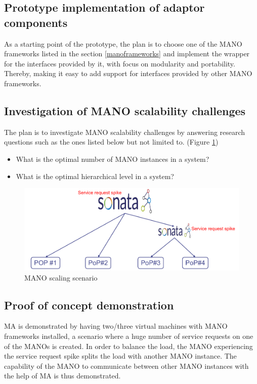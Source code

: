 \subsection{Prototype implementation of adaptor components}

As a starting point of the prototype, the plan is to choose one of the MANO frameworks listed in the section \ref{manoframeworks} and implement the wrapper for the interfaces provided by it, with focus on modularity and portability. Thereby, making it easy to add support for interfaces provided by other MANO frameworks.

\subsection{Investigation of MANO scalability challenges}
\label{wp3manoresearch}
The plan is to investigate MANO scalability challenges by answering research questions such as the ones listed below but not limited to. (Figure \ref{fig:wp3manoscale})
\begin{itemize}
	\item What is the optimal number of MANO instances in a system?
	\item What is the optimal hierarchical level in a system?
\end{itemize}

\begin{figure}[h]
	\centering
	\includegraphics[width=0.9\linewidth]{figures/wp3manoScale}
	\caption{MANO scaling scenario \cite{WPDescriptionsPDF}}
	\label{fig:wp3manoscale}
\end{figure}


\subsection{Proof of concept demonstration}
MA is demonstrated by having two/three virtual machines with MANO frameworks installed, a scenario where a huge number of service requests on one of the MANOs is created. In order to balance the load, the MANO experiencing the service request spike splits the load with another MANO instance. The capability of the MANO to communicate between other MANO instances with the help of MA is thus demonstrated.

